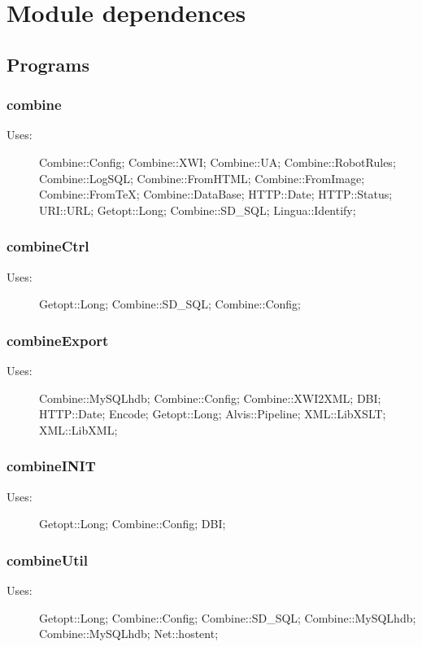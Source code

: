 
\section{Module dependences}
\label{moddep}
\subsection{Programs}
\subsubsection{combine}
\begin{description}
\item[Uses:] Combine::Config; Combine::XWI; Combine::UA; Combine::RobotRules; Combine::LogSQL; Combine::FromHTML; Combine::FromImage; Combine::FromTeX; Combine::DataBase; HTTP::Date; HTTP::Status; URI::URL; Getopt::Long; Combine::SD\_SQL; Lingua::Identify; 

\end{description}
\subsubsection{combineCtrl}
\begin{description}
\item[Uses:] Getopt::Long; Combine::SD\_SQL; Combine::Config; 

\end{description}
\subsubsection{combineExport}
\begin{description}
\item[Uses:] Combine::MySQLhdb; Combine::Config; Combine::XWI2XML; DBI; HTTP::Date; Encode; Getopt::Long; Alvis::Pipeline; XML::LibXSLT; XML::LibXML; 

\end{description}
\subsubsection{combineINIT}
\begin{description}
\item[Uses:] Getopt::Long; Combine::Config; DBI; 

\end{description}
\subsubsection{combineUtil}
\begin{description}
\item[Uses:] Getopt::Long; Combine::Config; Combine::SD\_SQL; Combine::MySQLhdb; Combine::MySQLhdb; Net::hostent; 

\end{description}
